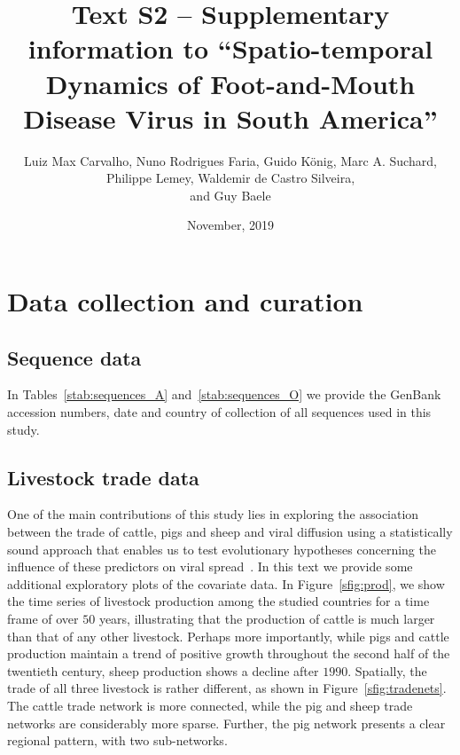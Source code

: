 \documentclass[a4paper,10pt]{article}
\title{Text S2 -- Supplementary information to ``Spatio-temporal Dynamics of Foot-and-Mouth Disease Virus in South America''}
\author{
Luiz Max Carvalho, Nuno Rodrigues Faria, Guido K\"onig,
Marc A. Suchard,\\ 
Philippe Lemey, Waldemir de Castro Silveira,\\
and Guy Baele
}
\date{November, 2019}
\begin{document}
\maketitle

\section*{Data collection and curation}

\subsection*{Sequence data}

In Tables~\ref{stab:sequences_A} and~\ref{stab:sequences_O} we provide the GenBank accession numbers, date and country of collection of all sequences used in this study.

\subsection*{Livestock trade data}

One of the main contributions of this study lies in exploring the association between the trade of cattle, pigs and sheep and viral diffusion using a statistically sound approach that enables us to test evolutionary hypotheses concerning the influence of these predictors on viral spread~\citep{M-Lemey2014}. %
In this text we provide some additional exploratory plots of the covariate data.
In Figure~\ref{sfig:prod}, we show the time series of livestock production among the studied countries for a time frame of over $50$ years, illustrating that the production of cattle is much larger than that of any other livestock. %
Perhaps more importantly, while pigs and cattle production maintain a trend of positive growth throughout the second half of the twentieth century, sheep production shows a decline after $1990$.
Spatially, the trade of all three livestock is rather different, as shown in Figure~\ref{sfig:tradenets}. %
The cattle trade network is more connected, while the pig and sheep trade networks are considerably more sparse.
Further, the pig network presents a clear regional pattern, with two sub-networks. %
\end{document}
